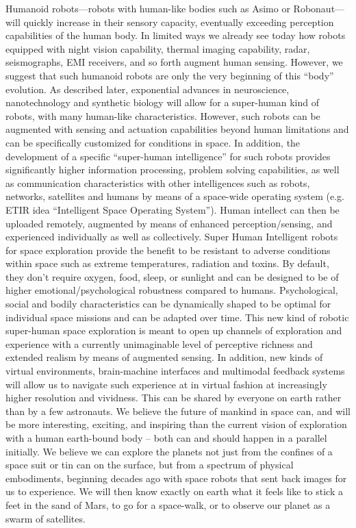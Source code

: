 \documentclass[letter,11pt]{article}
\begin{document}
Humanoid robots---robots with human-like bodies such as Asimo or
Robonaut---will quickly increase in their sensory capacity, eventually
exceeding perception capabilities of the human body. In limited ways we already
see today how robots equipped with night vision capability, thermal imaging
capability, radar, seismographs, EMI receivers, and so forth augment human
sensing. However, we suggest that such humanoid robots are only the very
beginning of this ``body'' evolution. As described later, exponential advances
in neuroscience, nanotechnology and synthetic biology will allow for a
super-human kind of robots, with many human-like characteristics. However, such
robots can be augmented with sensing and actuation capabilities beyond human
limitations and can be specifically customized for conditions in space. In
addition, the development of a specific ``super-human intelligence'' for such
robots provides significantly higher information processing, problem solving
capabilities, as well as communication characteristics with other intelligences
such as robots, networks, satellites and humans by means of a space-wide
operating system (e.g. ETIR idea ``Intelligent Space Operating System''). Human
intellect can then be uploaded remotely, augmented by means of enhanced
perception/sensing, and experienced individually as well as collectively. Super
Human Intelligent robots for space exploration provide the benefit to be
resistant to adverse conditions within space such as extreme temperatures,
radiation and toxins. By default, they don't require oxygen, food, sleep, or
sunlight and can be designed to be of higher emotional/psychological robustness
compared to humans. Psychological, social and bodily characteristics can be
dynamically shaped to be optimal for individual space missions and can be
adapted over time.  This new kind of robotic super-human space exploration is
meant to open up channels of exploration and experience with a currently
unimaginable level of perceptive richness and extended realism by means of
augmented sensing.  In addition, new kinds of virtual environments,
brain-machine interfaces and multimodal feedback systems will allow us to
navigate such experience at in virtual fashion at increasingly higher
resolution and vividness. This can be shared by everyone on earth rather than
by a few astronauts.  We believe the future of mankind in space can, and will
be more interesting, exciting, and inspiring than the current vision of
exploration with a human earth-bound body -- both can and should happen in a
parallel initially. We believe we can explore the planets not just from the
confines of a space suit or tin can on the surface, but from a spectrum of
physical embodiments, beginning decades ago with space robots that sent back
images for us to experience.  We will then know exactly on earth what it feels
like to stick a feet in the sand of Mars, to go for a space-walk, or to observe
our planet as a swarm of satellites.
\end{document}
